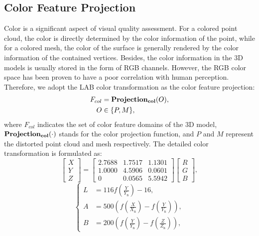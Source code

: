 \documentclass[lettersize,journal]{IEEEtran}
\begin{document}
\subsection{Color Feature Projection}
\label{pc:color}
Color is a significant aspect of visual quality assessment. For a colored point cloud, the color is directly determined by the color information of the point, while for a colored mesh, the color of the surface is generally rendered by the color information of the contained vertices. Besides, the color information in the 3D models is usually stored in the form of RGB channels. However, the RGB color space has been proven to have a poor correlation with human perception.
Therefore, we adopt the LAB color transformation as the color feature projection:
\begin{equation}
 \begin{aligned}
    F_{col} &= \boldsymbol{\rm{Projection_{col}}}(O), \\
    O & \in \{P, M\},
\end{aligned}   
\end{equation}
where $F_{col}$ indicates the set of color feature domains of the 3D model, $\boldsymbol{\rm{Projection_{col}}}(\cdot)$ stands for the color projection function, and $P$ and $M$ represent the distorted point cloud and mesh respectively. The detailed color transformation is formulated as:
\begin{equation}
\left[\begin{array}{c}
X \\
Y \\
Z
\end{array}\right]=\left[\begin{array}{ccc}
2.7688 & 1.7517 & 1.1301 \\
1.0000 & 4.5906 & 0.0601 \\
0 & 0.0565 & 5.5942
\end{array}\right]\left[\begin{array}{c}
R \\
G \\
B
\end{array}\right],
\end{equation}
\begin{equation}
\left\{
\begin{array}{lll}
L &=116 f\left(\frac{Y}{Y_{\mathrm{n}}}\right)-16, \\
A &=500\left(f\left(\frac{X}{X_{\mathrm{n}}}\right)-f\left(\frac{Y}{Y_{\mathrm{n}}}\right)\right), \\
B &=200\left(f\left(\frac{Y}{Y_{\mathrm{n}}}\right)-f\left(\frac{Z}{Z_{\mathrm{n}}}\right)\right),
\end{array}
\right.
\end{equation}
\end{document}
